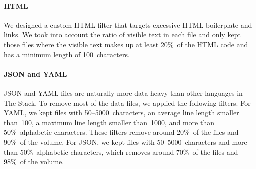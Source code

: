 \documentclass[10pt]{article} %
\begin{document}
\paragraph{HTML} We designed a custom HTML filter that targets excessive HTML boilerplate and links. We took into account the ratio of visible text in each file and only kept those files where the visible text makes up at least 20\%~of the HTML code and has a minimum length of 100~characters.

\paragraph{JSON and YAML} 
JSON and YAML files are naturally more data-heavy than other languages in The Stack. To remove most of the data files, we applied the following filters. For YAML, we kept files with 50--5000~characters, an average line length smaller than~100, a maximum line length smaller than~1000, and more than 50\%~alphabetic characters. These filters remove around 20\%~of the files and 90\%~of the volume. For JSON, we kept files with 50--5000~characters and more than 50\%~alphabetic characters, which removes around 70\%~of the files and 98\%~of the volume. 
\end{document}
